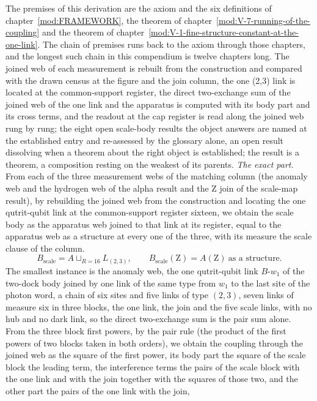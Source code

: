 \begin{chproof}
The premises of this derivation are the axiom and the six definitions of chapter~\ref{mod:FRAMEWORK}, the theorem of chapter~\ref{mod:V-7-running-of-the-coupling} and the theorem of chapter~\ref{mod:V-1-fine-structure-constant-at-the-one-link}. The chain of premises runs back to the axiom through those chapters, and the longest such chain in this compendium is twelve chapters long.
The joined web of each measurement is rebuilt from the construction and compared with the drawn census at the figure and the join column, the one (2,3) link is located at the common-support register, the direct two-exchange sum of the joined web of the one link and the apparatus is computed with its body part and its cross terms, and the readout at the cap register is read along the joined web rung by rung; the eight open scale-body results the object answers are named at the established entry and re-assessed by the glossary alone, an open result dissolving when a theorem about the right object is established; the result is a theorem, a composition resting on the weakest of its parents.
\textit{The exact part.}
From each of the three measurement webs of the matching column (the anomaly web and the hydrogen web of the alpha result and the Z join of the scale-map result), by rebuilding the joined web from the construction and locating the one qutrit-qubit link at the common-support register sixteen, we obtain the scale body as the apparatus web joined to that link at its register, equal to the apparatus web as a structure at every one of the three, with its measure the scale clause of the column.
\begin{equation}
B_{\mathrm{scale}} = A \sqcup_{R = 16} L_{(2,3)}, \qquad B_{\mathrm{scale}}(\mathrm{Z}) = A(\mathrm{Z}) \ \text{as a structure} .
\end{equation}
The smallest instance is the anomaly web, the one qutrit-qubit link $B$-$w_{1}$ of the two-dock body joined by one link of the same type from $w_{1}$ to the last site of the photon word, a chain of six sites and five links of type $(2,3)$, seven links of measure six in three blocks, the one link, the join and the five scale links, with no hub and no dark link, so the direct two-exchange sum is the pair sum alone. From the three block first powers, by the pair rule (the product of the first powers of two blocks taken in both orders), we obtain the coupling through the joined web as the square of the first power, its body part the square of the scale block the leading term, the interference terms the pairs of the scale block with the one link and with the join together with the squares of those two, and the other part the pairs of the one link with the join,

\end{chproof}
